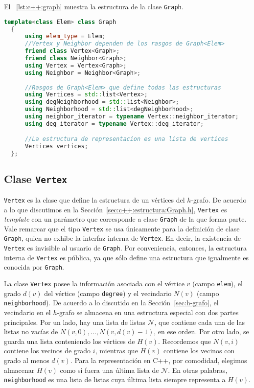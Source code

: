 \documentclass[%
    a4paper,%
    fontsize=12pt,%
    DIV=12,
    twoside,%
    openright,%
    titlepage=true,%
    headsepline,%
    toc=bibliography,%
    parskip=half,%
    cleardoublepage=empty,%
    headings=big,%
]{scrbook}
\makeatletter
\newcommand{\Code}[1]{\lstinline[basicstyle={\ttfamily}]@#1@}
\newcommand{\CPPCode}[1]{\lstinline[language=C++,basicstyle={\ttfamily}]@#1@}
\newcommand{\N}{\mathcal{N}}
\newcommand{\Graph}{\CPPCode{Graph}\xspace}
\DeclareRobustCommand{\CPP}{C\nolinebreak[4]\hspace{-.05em}\raisebox{.4ex}{\relsize{-3}\textbf{++}}\xspace}
\def\CPP{C++}%
\makeatother
\begin{document}
El \lstlistingname~\ref{lst:c++:graph} muestra la estructura de la clase \Graph.

\begin{lstlisting}[language={C++},caption={Estructura del tipo Grafo en C++.},gobble=2,float=ht,label={lst:c++:graph}]
  template<class Elem> class Graph
  {
      using elem_type = Elem;
      //Vertex y Neighbor dependen de los rasgos de Graph<Elem>
      friend class Vertex<Graph>;
      friend class Neighbor<Graph>;
      using Vertex = Vertex<Graph>; 
      using Neighbor = Neighbor<Graph>;
      
      //Rasgos de Graph<Elem> que define todas las estructuras
      using Vertices = std::list<Vertex>;
      using degNeighborhood = std::list<Neighbor>;
      using Neighborhood = std::list<degNeighborhood>;
      using neighbor_iterator = typename Vertex::neighbor_iterator;
      using deg_iterator = typename Vertex::deg_iterator;

      //La estructura de representacion es una lista de vertices
      Vertices vertices;
  };
\end{lstlisting}

\subsection{Clase \texorpdfstring{\protect\CPPCode{Vertex}}{Vertex}}
\label{sec:c++:estructura:Vertex.h}

\CPPCode{Vertex} es la clase que define la estructura de un vértices del $h$-grafo.  De acuerdo a lo que discutimos en la Sección~\ref{sec:c++:estructura:Graph.h}, \CPPCode{Vertex} es \emph{template} con un parámetro que corresponde a clase \CPPCode{Graph} de la que forma parte.  Vale remarcar que el tipo \CPPCode{Vertex} se usa únicamente para la definición de clase \Code{Graph}, quien no exhibe la interfaz interna de \CPPCode{Vertex}.  En decir, la existencia de \CPPCode{Vertex} es invisible al usuario de \CPPCode{Graph}.  Por conveniencia, entonces, la estructura interna de \CPPCode{Vertex} es pública, ya que sólo define una estructura que igualmente es conocida por \Code{Graph}.

La clase \CPPCode{Vertex} posee la información asociada con el vértice $v$ (campo \CPPCode{elem}), el grado $d(v)$ del vértice (campo \CPPCode{degree}) y el vecindario $N(v)$ (campo \CPPCode{neighborhood}).  De acuerdo a lo discutido en la Sección~\ref{sec:h-grafo}, el vecindario en el $h$-grafo se almacena en una estructura especial con dos partes principales.  Por un lado, hay una lista de listas $\N$, que contiene cada una de las listas no vacías de $N(v, 0), \ldots, N(v, d(v)-1)$, en ese orden.  Por otro lado, se guarda una lista conteniendo los vértices de $H(v)$.  Recordemos que $N(v, i)$ contiene los vecinos de grado $i$, mientras que $H(v)$ contiene los vecinos con grado al menos $d(v)$.  Para la representación en \CPP, por comodidad, elegimos almacenar $H(v)$ como si fuera una última lista de $\N$.  En otras palabras, \CPPCode{neighborhood} es una lista de listas cuya última lista siempre representa a $H(v)$.
\end{document}

